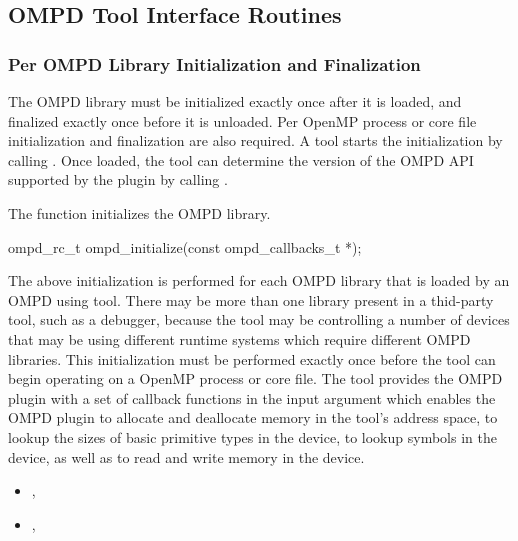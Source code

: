 
\subsection{OMPD Tool Interface Routines}
\label{subsec:ompd-api}

\subsubsection{Per OMPD Library Initialization and Finalization}

The OMPD library must be initialized exactly once after it is loaded, and finalized exactly once
before it is unloaded. Per OpenMP process or core file initialization and finalization are also required. 
A tool starts the initialization by calling . Once loaded, the 
tool can determine the version of the OMPD API supported by the plugin by 
calling .

\label{subsubsubsec:ompd_initialize}

\summary
The  function initializes the OMPD library.

\format

\begin{cspecific}
\begin{ompSyntax}
ompd_rc_t ompd_initialize(const ompd_callbacks_t *);
\end{ompSyntax}
\end{cspecific}

\descr
The above initialization is performed for each OMPD library that is loaded by an OMPD using tool. 
There may be more than one library present in a thid-party tool, such as a debugger, because the tool 
may be controlling a number of devices that may be using different runtime systems which require 
different OMPD libraries. This initialization must be performed exactly once before the tool
can begin operating on a OpenMP process or core file.
\argdesc
The tool provides the OMPD plugin with a set of callback functions in the  input argument
which enables the OMPD plugin to allocate and deallocate memory in the tool's address space, to lookup the 
sizes of basic primitive types in the device, to lookup symbols in the device, as well as to read and 
write memory in the device.

\crossreferences
\begin{itemize}
	\item
	, 
	\item
	, 
\end{itemize}

